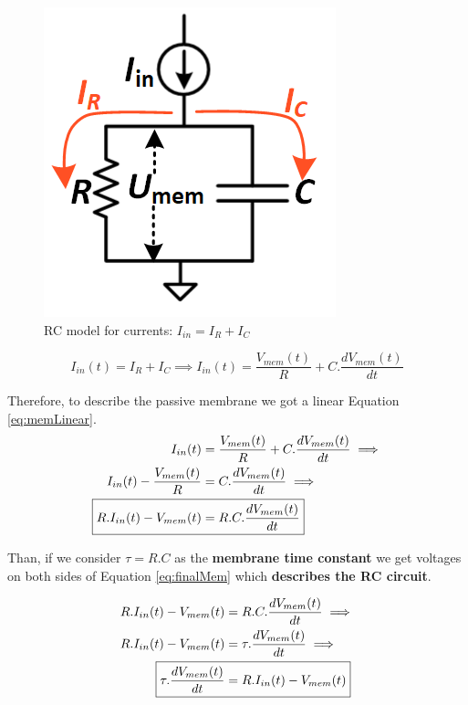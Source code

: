 		\begin{figure}[H]
			\centering
			\includegraphics[width=0.4\linewidth]{images/rcmodel2}
			\caption[RC model for currents]{RC model for currents: $I_{in} = I_R + I_C$}
			\label{fig:rcmodel2}
		\end{figure}
		
		\begin{equation}
			\label{eq:totalNeuronCurrent}
			I_{in}(t) = I_R + I_C \implies I_{in}(t) = \frac{V_{mem}(t)}{R} + C.\dfrac{dV_{mem}(t)}{dt}
		\end{equation}
		\par Therefore, to describe the passive membrane we got a linear Equation \ref{eq:memLinear}.
		\begin{equation}
			\label{eq:memLinear}
			\begin{aligned}
				I_{in}(t) &= \frac{V_{mem}(t)}{R} + C.\dfrac{dV_{mem}(t)}{dt} \implies \\ 
				I_{in}(t) - \frac{V_{mem}(t)}{R} &=  C.\dfrac{dV_{mem}(t)}{dt} \implies \\
				\Aboxed{R.I_{in}(t) - V_{mem}(t) &=  R.C.\dfrac{dV_{mem}(t)}{dt}}
			\end{aligned}
		\end{equation}
		
		\par Than, if we consider $\tau = R.C$ as the \textbf{membrane time constant} we get voltages on both sides of Equation \ref{eq:finalMem} which \textbf{describes the RC circuit}.
		
		\begin{equation}
			\label{eq:finalMem}
			\begin{aligned}
				R.I_{in}(t) - V_{mem}(t) &=  R.C.\dfrac{dV_{mem}(t)}{dt} \implies \\
				R.I_{in}(t) - V_{mem}(t) &=  \tau.\dfrac{dV_{mem}(t)}{dt} \implies \\
				\Aboxed{\tau.\dfrac{dV_{mem}(t)}{dt} &= R.I_{in}(t) - V_{mem}(t)}
			\end{aligned}
		\end{equation}
		
